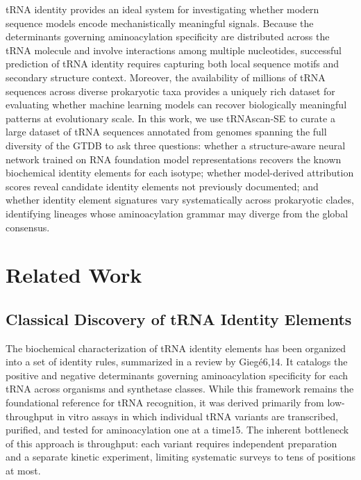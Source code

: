 \documentclass{article}
\begin{document}
tRNA identity provides an ideal system for investigating whether modern sequence models encode mechanistically meaningful signals. Because the determinants governing aminoacylation specificity are distributed across the tRNA molecule and involve interactions among multiple nucleotides, successful prediction of tRNA identity requires capturing both local sequence motifs and secondary structure context. Moreover, the availability of millions of tRNA sequences across diverse prokaryotic taxa provides a uniquely rich dataset for evaluating whether machine learning models can recover biologically meaningful patterns at evolutionary scale. In this work, we use tRNAscan-SE to curate a large dataset of tRNA sequences annotated from genomes spanning the full diversity of the GTDB to ask three questions: whether a structure-aware neural network trained on RNA foundation model representations recovers the known biochemical identity elements for each isotype; whether model-derived attribution scores reveal candidate identity elements not previously documented; and whether identity element signatures vary systematically across prokaryotic clades, identifying lineages whose aminoacylation grammar may diverge from the global consensus.


\section{Related Work}

\subsection{Classical Discovery of tRNA Identity Elements}

The biochemical characterization of tRNA identity elements has been organized into a set of identity rules, summarized in a review by Giegé6,14. It catalogs the positive and negative determinants governing aminoacylation specificity for each tRNA across organisms and synthetase classes. While this framework remains the foundational reference for tRNA recognition, it was derived primarily from low-throughput in vitro assays in which individual tRNA variants are transcribed, purified, and tested for aminoacylation one at a time15. The inherent bottleneck of this approach is throughput: each variant requires independent preparation and a separate kinetic experiment, limiting systematic surveys to tens of positions at most.
\end{document}
